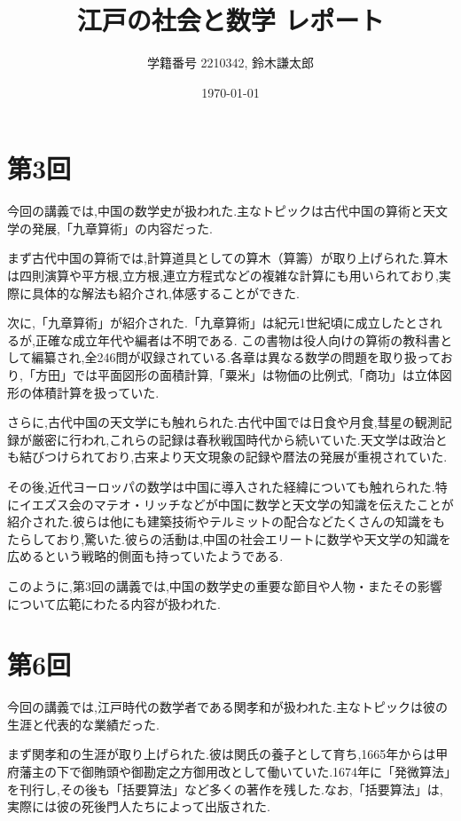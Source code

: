 \documentclass[autodetect-engine, dvi=dvipdfmx, 10pt, a4paper, ja=standard]{bxjsarticle}
\title{江戸の社会と数学 レポート}
\author{学籍番号 2210342, 鈴木謙太郎}
\date{\today}
\begin{document}
\maketitle


\section{第3回}


今回の講義では,中国の数学史が扱われた.主なトピックは古代中国の算術と天文学の発展,「九章算術」の内容だった.

まず古代中国の算術では,計算道具としての算木（算籌）が取り上げられた.算木は四則演算や平方根,立方根,連立方程式などの複雑な計算にも用いられており,実際に具体的な解法も紹介され,体感することができた.

次に,「九章算術」が紹介された.「九章算術」は紀元1世紀頃に成立したとされるが,正確な成立年代や編者は不明である.
この書物は役人向けの算術の教科書として編纂され,全246問が収録されている.各章は異なる数学の問題を取り扱っており,「方田」では平面図形の面積計算,「粟米」は物価の比例式,「商功」は立体図形の体積計算を扱っていた.

さらに,古代中国の天文学にも触れられた.古代中国では日食や月食,彗星の観測記録が厳密に行われ,これらの記録は春秋戦国時代から続いていた.天文学は政治とも結びつけられており,古来より天文現象の記録や暦法の発展が重視されていた.

その後,近代ヨーロッパの数学は中国に導入された経緯についても触れられた.特にイエズス会のマテオ・リッチなどが中国に数学と天文学の知識を伝えたことが紹介された.彼らは他にも建築技術やテルミットの配合などたくさんの知識をもたらしており,驚いた.彼らの活動は,中国の社会エリートに数学や天文学の知識を広めるという戦略的側面も持っていたようである.

このように,第3回の講義では,中国の数学史の重要な節目や人物・またその影響について広範にわたる内容が扱われた.


\section{第6回}


今回の講義では,江戸時代の数学者である関孝和が扱われた.主なトピックは彼の生涯と代表的な業績だった.

まず関孝和の生涯が取り上げられた.彼は関氏の養子として育ち,1665年からは甲府藩主の下で御賄頭や御勘定之方御用改として働いていた.1674年に「発微算法」を刊行し,その後も「括要算法」など多くの著作を残した.なお,「括要算法」は,実際には彼の死後門人たちによって出版された.
\end{document}
